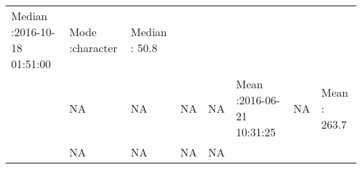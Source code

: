 \documentclass[]{article}
\theoremstyle{definition}
\theoremstyle{definition}
\theoremstyle{definition}
\theoremstyle{remark}
\begin{document}
\begin{longtable}[]{@{}llllllll@{}}
\begin{minipage}[t]{0.16\columnwidth}
Median :2016-10-18 01:51:00\strut
\end{minipage} & \begin{minipage}[t]{0.10\columnwidth}\raggedright\strut
Mode :character\strut
\end{minipage} & \begin{minipage}[t]{0.09\columnwidth}\raggedright\strut
Median : 50.8\strut
\end{minipage}\tabularnewline
\begin{minipage}[t]{0.02\columnwidth}\raggedright\strut
\strut
\end{minipage} & \begin{minipage}[t]{0.10\columnwidth}\raggedright\strut
NA\strut
\end{minipage} & \begin{minipage}[t]{0.10\columnwidth}\raggedright\strut
NA\strut
\end{minipage} & \begin{minipage}[t]{0.10\columnwidth}\raggedright\strut
NA\strut
\end{minipage} & \begin{minipage}[t]{0.10\columnwidth}\raggedright\strut
NA\strut
\end{minipage} & \begin{minipage}[t]{0.16\columnwidth}\raggedright\strut
Mean :2016-06-21 10:31:25\strut
\end{minipage} & \begin{minipage}[t]{0.10\columnwidth}\raggedright\strut
NA\strut
\end{minipage} & \begin{minipage}[t]{0.09\columnwidth}\raggedright\strut
Mean : 263.7\strut
\end{minipage}\tabularnewline
\begin{minipage}[t]{0.02\columnwidth}\raggedright\strut
\strut
\end{minipage} & \begin{minipage}[t]{0.10\columnwidth}\raggedright\strut
NA\strut
\end{minipage} & \begin{minipage}[t]{0.10\columnwidth}\raggedright\strut
NA\strut
\end{minipage} & \begin{minipage}[t]{0.10\columnwidth}\raggedright\strut
NA\strut
\end{minipage} & \begin{minipage}[t]{0.10\columnwidth}\raggedright\strut
NA\strut
\end{minipage} & \begin{minipage}[t]{0.16\columnwidth}\raggedright\strut

\end{minipage}
\end{longtable}
\end{document}
